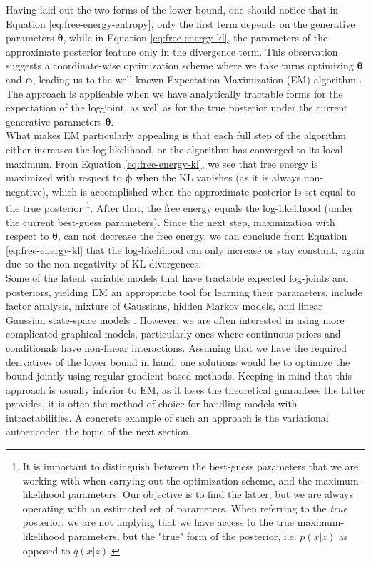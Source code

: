 \documentclass{report}
\begin{document}
\noindent Having laid out the two forms of the lower bound, one should notice that in Equation \ref{eq:free-energy-entropy}, only the first term depends on the generative parameters $\boldsymbol{\theta}$, while in Equation \ref{eq:free-energy-kl}, the parameters of the approximate posterior feature only in the divergence term. This observation suggests a coordinate-wise optimization scheme where we take turns optimizing $\boldsymbol{\theta}$ and $\boldsymbol{\phi}$, leading us to the well-known Expectation-Maximization (EM) algorithm \cite{missing-data}. The approach is applicable when we have analytically tractable forms for the expectation of the log-joint, as well as for the true posterior under the current generative parameters $\boldsymbol{\theta}$. \\


\noindent What makes EM particularly appealing is that each full step of the algorithm either increases the log-likelihood, or the algorithm has converged to its local maximum. From Equation \ref{eq:free-energy-kl}, we see that free energy is maximized with respect to $\boldsymbol{\phi}$ when the KL vanishes (as it is always non-negative), which is accomplished when the approximate posterior is set equal to the true posterior \footnote{It is important to distinguish between the best-guess parameters that we are working with when carrying out the optimization scheme, and the maximum-likelihood parameters. Our objective is to find the latter, but we are always operating with an estimated set of parameters. When referring to the \textit{true} posterior, we are not implying that we have access to the true maximum-likelihood parameters, but the "true" form of the posterior, i.e. $p(x|z)$ as opposed to $q(x|z)$.}. After that, the free energy equals the log-likelihood (under the current best-guess parameters). Since the next step, maximization with respect to $\boldsymbol{\theta}$, can not decrease the free energy, we can conclude from Equation \ref{eq:free-energy-kl} that the log-likelihood can only increase or stay constant, again due to the non-negativity of KL divergences. \\

\noindent Some of the latent variable models that have tractable expected log-joints and posteriors, yielding EM an appropriate tool for learning their parameters, include factor analysis, mixture of Gaussians, hidden Markov models, and linear Gaussian state-space models \cite{kalman-filter, bishop-prml}. However, we are often interested in using more complicated graphical models, particularly ones where continuous priors and conditionals have non-linear interactions. Assuming that we have the required derivatives of the lower bound in hand, one solutions would be to optimize the bound jointly using regular gradient-based methods. Keeping in mind that this approach is usually inferior to EM, as it loses the theoretical guarantees the latter provides, it is often the method of choice for handling models with intractabilities. A concrete example of such an approach is the variational autoencoder, the topic of the next section.
\end{document}
